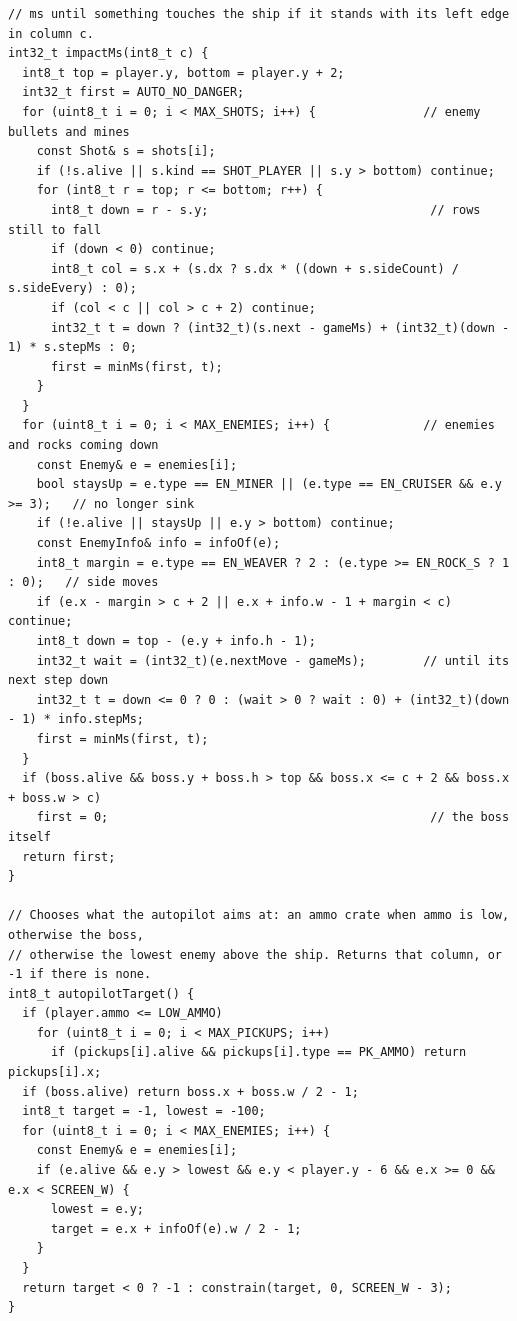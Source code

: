 \documentclass[11pt,a4paper]{article}
\begin{document}
\begin{latin}
\begin{lstlisting}[language=Arduino]
// ms until something touches the ship if it stands with its left edge in column c.
int32_t impactMs(int8_t c) {
  int8_t top = player.y, bottom = player.y + 2;
  int32_t first = AUTO_NO_DANGER;
  for (uint8_t i = 0; i < MAX_SHOTS; i++) {               // enemy bullets and mines
    const Shot& s = shots[i];
    if (!s.alive || s.kind == SHOT_PLAYER || s.y > bottom) continue;
    for (int8_t r = top; r <= bottom; r++) {
      int8_t down = r - s.y;                               // rows still to fall
      if (down < 0) continue;
      int8_t col = s.x + (s.dx ? s.dx * ((down + s.sideCount) / s.sideEvery) : 0);
      if (col < c || col > c + 2) continue;
      int32_t t = down ? (int32_t)(s.next - gameMs) + (int32_t)(down - 1) * s.stepMs : 0;
      first = minMs(first, t);
    }
  }
  for (uint8_t i = 0; i < MAX_ENEMIES; i++) {             // enemies and rocks coming down
    const Enemy& e = enemies[i];
    bool staysUp = e.type == EN_MINER || (e.type == EN_CRUISER && e.y >= 3);   // no longer sink
    if (!e.alive || staysUp || e.y > bottom) continue;
    const EnemyInfo& info = infoOf(e);
    int8_t margin = e.type == EN_WEAVER ? 2 : (e.type >= EN_ROCK_S ? 1 : 0);   // side moves
    if (e.x - margin > c + 2 || e.x + info.w - 1 + margin < c) continue;
    int8_t down = top - (e.y + info.h - 1);
    int32_t wait = (int32_t)(e.nextMove - gameMs);        // until its next step down
    int32_t t = down <= 0 ? 0 : (wait > 0 ? wait : 0) + (int32_t)(down - 1) * info.stepMs;
    first = minMs(first, t);
  }
  if (boss.alive && boss.y + boss.h > top && boss.x <= c + 2 && boss.x + boss.w > c)
    first = 0;                                             // the boss itself
  return first;
}

// Chooses what the autopilot aims at: an ammo crate when ammo is low, otherwise the boss,
// otherwise the lowest enemy above the ship. Returns that column, or -1 if there is none.
int8_t autopilotTarget() {
  if (player.ammo <= LOW_AMMO)
    for (uint8_t i = 0; i < MAX_PICKUPS; i++)
      if (pickups[i].alive && pickups[i].type == PK_AMMO) return pickups[i].x;
  if (boss.alive) return boss.x + boss.w / 2 - 1;
  int8_t target = -1, lowest = -100;
  for (uint8_t i = 0; i < MAX_ENEMIES; i++) {
    const Enemy& e = enemies[i];
    if (e.alive && e.y > lowest && e.y < player.y - 6 && e.x >= 0 && e.x < SCREEN_W) {
      lowest = e.y;
      target = e.x + infoOf(e).w / 2 - 1;
    }
  }
  return target < 0 ? -1 : constrain(target, 0, SCREEN_W - 3);
}


\end{lstlisting}
\end{latin}
\end{document}
